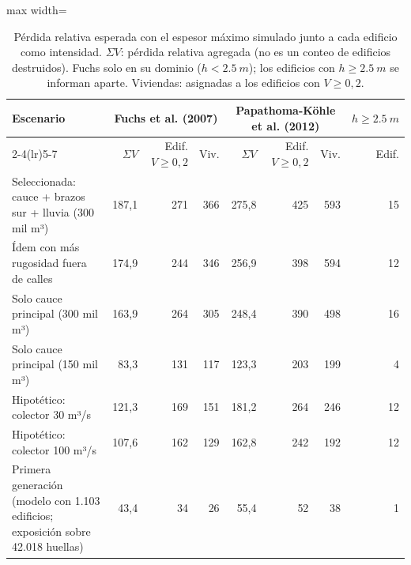 \begin{table}[htbp]\centering\small
\caption{Pérdida relativa esperada con el espesor máximo simulado junto a cada edificio como intensidad. $\Sigma V$: pérdida relativa agregada (no es un conteo de edificios destruidos). Fuchs solo en su dominio ($h<\SI{2,5}{m}$); los edificios con $h\geq\SI{2,5}{m}$ se informan aparte. Viviendas: asignadas a los edificios con $V\geq0{,}2$.}\label{tab:danio}
\begin{adjustbox}{max width=\textwidth}\begin{tabular}{p{}rrrrrrr}\toprule
Escenario & \multicolumn{3}{c}{Fuchs et al. (2007)} & \multicolumn{3}{c}{Papathoma-Köhle et al. (2012)} & $h\geq\SI{2,5}{m}$\\\cmidrule(lr){2-4}\cmidrule(lr){5-7}
 & $\Sigma V$ & Edif. $V\geq0{,}2$ & Viv. & $\Sigma V$ & Edif. $V\geq0{,}2$ & Viv. & Edif.\\\midrule
Seleccionada: cauce + brazos sur + lluvia (300 mil m³) & 187,1 & 271 & 366 & 275,8 & 425 & 593 & 15\\
Ídem con más rugosidad fuera de calles & 174,9 & 244 & 346 & 256,9 & 398 & 594 & 12\\
Solo cauce principal (300 mil m³) & 163,9 & 264 & 305 & 248,4 & 390 & 498 & 16\\
Solo cauce principal (150 mil m³) & 83,3 & 131 & 117 & 123,3 & 203 & 199 & 4\\
Hipotético: colector 30 m³/s & 121,3 & 169 & 151 & 181,2 & 264 & 246 & 12\\
Hipotético: colector 100 m³/s & 107,6 & 162 & 129 & 162,8 & 242 & 192 & 12\\
Primera generación (modelo con 1.103 edificios; exposición sobre 42.018 huellas) & 43,4 & 34 & 26 & 55,4 & 52 & 38 & 1\\
\bottomrule\end{tabular}\end{adjustbox}\end{table}
